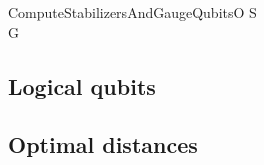 \documentclass[twocolumn,showpacs,preprintnumbers,amsmath,amssymb,nofootinbib,pra,floatfix]{revtex4}
\begin{document}
\begin{pseudocode}{ComputeStabilizersAndGaugeQubits}{O}
S \GETS {}\\
G \GETS {}
\end{pseudocode}
\subsection{Logical qubits}

\label{logical-qubits}
\subsection{Optimal distances}

\label{optimal-distances}
\end{document}
